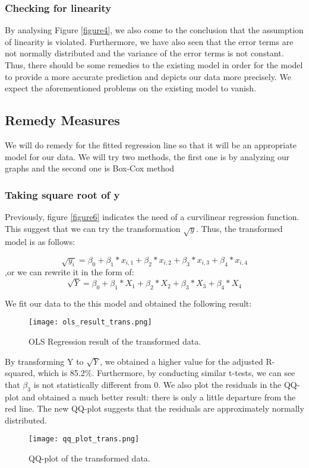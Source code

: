 \documentclass[english]{article}
\begin{document}
\subsubsection{Checking for linearity}
By analysing Figure \ref{figure4}, we also come to the conclusion that the assumption of linearity is violated. Furthermore, we have also seen that the error terms are not normally distributed and the variance of the error terms is not constant. Thus, there should be some remedies to the existing model in order for the model to provide a more accurate prediction and depicts our data more precisely. We expect the aforementioned problems on the existing model to vanish.


\subsection{Remedy Measures}
We will do remedy for the fitted regression line so that it will be an appropriate model for our data. We will try two methods, the first one is by analyzing our graphs and the second one is Box-Cox method

\subsubsection{Taking square root of y}
Previously, figure \ref{figure6} indicates the need of a curvilinear regression function. This suggest that we can try the transformation $\sqrt{y}$. Thus, the transformed model is as follows: 

$$ \sqrt{y_i} = \beta_0 + \beta_1 * x_{i,1} + \beta_2 * x_{i,2} + \beta_3 * x_{i,3} + \beta_4 * x_{i,4} $$
,or we can rewrite it in the form of: 
$$ \sqrt{Y} = \beta_0 + \beta_1 * X_{1} + \beta_2 * X_{2} + \beta_3 * X_{3} + \beta_4 * X_{4} $$

We fit our data to the this model and obtained the following result: 
\begin{figure}[H]
	\begin{centering}
  		\texttt{[image: ols\_result\_trans.png]}
  		\caption{OLS Regression result of the transformed data.\label{figure8}
}
	\end{centering}
\end{figure}

By transforming Y to $\sqrt{Y}$, we obtained a higher value for the adjusted R-squared, which is 85.2\%. Furthermore, by conducting similar t-tests, we can see that $\beta_3$ is not statistically different from 0. We also plot the residuals in the QQ-plot and obtained a much better result: there is only a little departure from the red line. The new QQ-plot suggests that the residuals are approximately normally distributed. 
\begin{figure}[H]
	\begin{centering}
  		\texttt{[image: qq\_plot\_trans.png]}
  		\caption{QQ-plot of the transformed data.\label{figure9}
}
	\end{centering}
\end{figure}
\end{document}
